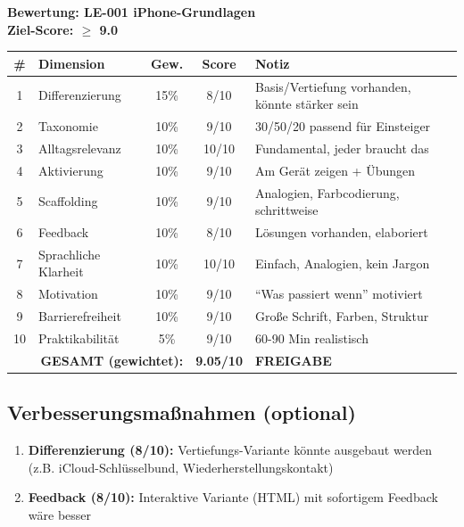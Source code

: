 \documentclass[11pt,a4paper]{article}
\begin{document}
\begin{scorebox}
\textbf{Bewertung: LE-001 iPhone-Grundlagen}\\
\textbf{Ziel-Score: $\geq$ 9.0}

\vspace{1em}
\begin{tabular}{|c|l|c|c|p{3.8cm}|}
\hline
\textbf{\#} & \textbf{Dimension} & \textbf{Gew.} & \textbf{Score} & \textbf{Notiz} \\
\hline
1 & Differenzierung & 15\% & 8/10 & Basis/Vertiefung vorhanden, könnte stärker sein \\
\hline
2 & Taxonomie & 10\% & 9/10 & 30/50/20 passend für Einsteiger \\
\hline
3 & Alltagsrelevanz & 10\% & 10/10 & Fundamental, jeder braucht das \\
\hline
4 & Aktivierung & 10\% & 9/10 & Am Gerät zeigen + Übungen \\
\hline
5 & Scaffolding & 10\% & 9/10 & Analogien, Farbcodierung, schrittweise \\
\hline
6 & Feedback & 10\% & 8/10 & Lösungen vorhanden, elaboriert \\
\hline
7 & Sprachliche Klarheit & 10\% & 10/10 & Einfach, Analogien, kein Jargon \\
\hline
8 & Motivation & 10\% & 9/10 & ``Was passiert wenn'' motiviert \\
\hline
9 & Barrierefreiheit & 10\% & 9/10 & Große Schrift, Farben, Struktur \\
\hline
10 & Praktikabilität & 5\% & 9/10 & 60-90 Min realistisch \\
\hline
\multicolumn{3}{|r|}{\textbf{GESAMT (gewichtet):}} & \textbf{9.05/10} & \textcolor{successgreen}{\textbf{FREIGABE}} \\
\hline
\end{tabular}
\end{scorebox}

\subsection{Verbesserungsmaßnahmen (optional)}

\begin{enumerate}
    \item \textbf{Differenzierung (8/10):} Vertiefungs-Variante könnte ausgebaut werden (z.B. iCloud-Schlüsselbund, Wiederherstellungskontakt)
    \item \textbf{Feedback (8/10):} Interaktive Variante (HTML) mit sofortigem Feedback wäre besser
\end{enumerate}

\vspace{1em}
\end{document}
